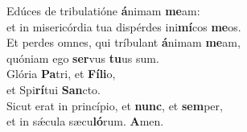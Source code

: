 \oddverse Edúces de tribulatióne \textbf{á}nimam \textbf{me}am:~\*\\
\oddverse et in misericórdia tua dispérdes ini\textbf{mí}cos \textbf{me}os.\\
\evenverse Et perdes omnes, qui tríbulant \textbf{á}nimam \textbf{me}am,~\*\\
\evenverse quóniam ego \textbf{ser}vus \textbf{tu}us sum.\\
\oddverse Glória \textbf{Pa}tri, et \textbf{Fí}\textbf{li}o,~\*\\
\oddverse et Spi\textbf{rí}tui \textbf{San}cto.\\
\evenverse Sicut erat in princípio, et \textbf{nunc}, et \textbf{sem}per,~\*\\
\evenverse et in sǽcula sæcu\textbf{ló}rum. \textbf{A}men.\\
